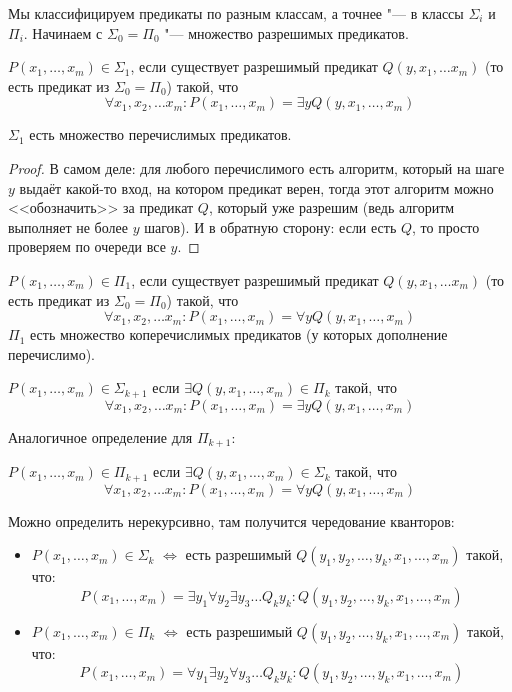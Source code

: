 Мы классифицируем предикаты по разным классам, а точнее "--- в классы $\Sigma_i$ и $\Pi_i$.
Начинаем с $\Sigma_0=\Pi_0$ "--- множество разрешимых предикатов.
\begin{Def}
	$P(x_1, \dots, x_m) \in \Sigma_1$, если существует разрешимый предикат $Q(y, x_1, \dots x_m)$
	(то есть предикат из $\Sigma_0 = \Pi_0$) такой, что
	\[
	\forall x_1, x_2, \dots x_m \colon P(x_1, \dots, x_m) = \exists y Q(y, x_1, \dots, x_m)
	\]
\end{Def}
\begin{Rem}
	$\Sigma_1$ есть множество перечислимых предикатов.
\end{Rem}
\begin{proof}
	В самом деле: для любого перечислимого есть алгоритм, который на шаге $y$ выдаёт какой-то
	вход, на котором предикат верен, тогда этот алгоритм можно <<обозначить>> за предикат $Q$,
	который уже разрешим (ведь алгоритм выполняет не более $y$ шагов).
	И в обратную сторону: если есть $Q$, то просто проверяем по очереди все $y$.
\end{proof}

\begin{Def}
  $P(x_1, \dots, x_m) \in \Pi_1$, если существует разрешимый предикат $Q(y, x_1, \dots x_m)$
  (то есть предикат из $\Sigma_0 = \Pi_0$) такой, что
  \[
  \forall x_1, x_2, \dots x_m \colon P(x_1, \dots, x_m) = \forall y Q(y, x_1, \dots, x_m)
  \]
  $\Pi_1$ есть множество коперечислимых предикатов (у которых дополнение перечислимо).
\end{Def}

\begin{Def}
	$P(x_1, \dots, x_m) \in \Sigma_{k+1}$ если $\exists Q(y, x_1, \dots, x_m) \in \Pi_k$ такой,
	что
	\[
	\forall x_1, x_2, \dots x_m \colon P(x_1, \dots, x_m) = \exists y Q(y, x_1, \dots, x_m)
	\]
\end{Def}
Аналогичное определение для $\Pi_{k+1}$:
\begin{Def}
	$P(x_1, \dots, x_m) \in \Pi_{k+1}$ если $\exists Q(y, x_1, \dots, x_m) \in \Sigma_k$ такой,
	что
	\[
	\forall x_1, x_2, \dots x_m \colon P(x_1, \dots, x_m) = \forall y Q(y, x_1, \dots, x_m)
	\]
\end{Def}
Можно определить нерекурсивно, там получится чередование кванторов:
\begin{itemize}
\item
	$P(x_1, \dots, x_m) \in \Sigma_k$ $\iff$ есть разрешимый $Q(y_1, y_2, \dots, y_k, x_1, \dots, x_m)$ такой, что:
	\[
		P(x_1, \dots, x_m) = \exists y_1 \forall y_2 \exists y_3 \dots Q_k y_k \colon Q(y_1, y_2, \dots, y_k, x_1, \dots, x_m)
	\]
\item
	$P(x_1, \dots, x_m) \in \Pi_k$ $\iff$ есть разрешимый $Q(y_1, y_2, \dots, y_k, x_1, \dots, x_m)$ такой, что:
	\[
		P(x_1, \dots, x_m) = \forall y_1 \exists y_2 \forall y_3 \dots Q_k y_k \colon Q(y_1, y_2, \dots, y_k, x_1, \dots, x_m)
	\]
\end{itemize}


